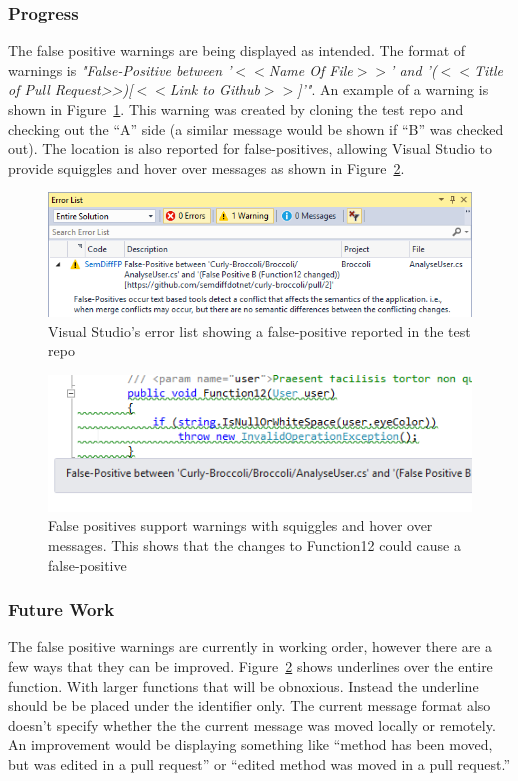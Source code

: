 \documentclass[draftclsnofoot,onecolumn]{IEEEtran}
\begin{document}
\subsubsection{Progress}
The false positive warnings are being displayed as intended. The format of 
warnings is \textit{"False-Positive between '$<<$Name Of File$>>$' and 
    '($<<$Title of Pull Request>>)[$<<$Link to Github$>>$]'"}. An example of 
a warning is shown in Figure~\ref{fperrorlist}. This warning was created by 
cloning the test repo and checking out the “A” side (a similar message would 
be shown if “B” was checked out). The location is also reported for 
false-positives, allowing Visual Studio to provide squiggles and hover over 
messages as shown in Figure~\ref{fphoverover}.

\begin{figure}[!htb]
\centering
\includegraphics[scale=1]{FalsePositiveErrorList}
\caption{Visual Studio’s error list showing a false-positive reported in the 
test repo}
\label{fperrorlist}
\end{figure}

\begin{figure}[!htb]
\centering
\includegraphics[scale=1]{FalsePositiveHoverOver}
\caption{False positives support warnings with squiggles and hover over 
messages. This shows that the changes to Function12 could cause a 
false-positive}
\label{fphoverover}
\end{figure}

\subsubsection{Future Work}

The false positive warnings are currently in working order, however there are a 
few ways that they can be improved. Figure~\ref{fphoverover} shows underlines 
over the entire function. With larger functions that will be obnoxious. Instead 
the underline should be be placed under the identifier only. The current 
message format also doesn’t specify whether the the current message was moved 
locally or remotely. An improvement would be displaying something like “method 
has been moved, but was edited in a pull request” or “edited method was moved 
in a pull request.”
\end{document}
